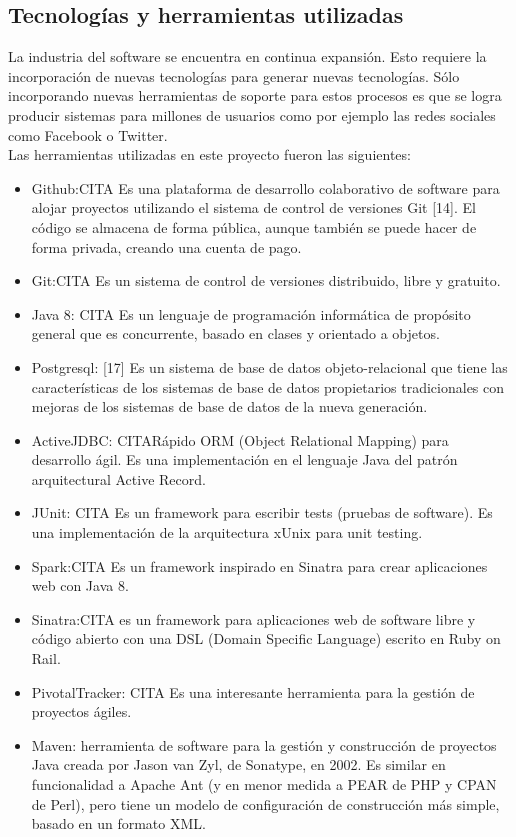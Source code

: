 \subsection{Tecnologías y herramientas utilizadas}
La industria del software se encuentra en continua expansión. Esto requiere la incorporación de nuevas tecnologías para generar
nuevas tecnologías. Sólo incorporando nuevas herramientas de soporte para estos procesos es que se logra producir sistemas para millones
de usuarios como por ejemplo las redes sociales como Facebook o Twitter. \\
Las herramientas utilizadas en este proyecto fueron las siguientes:
 \begin{itemize}
 \item Github:CITA Es una plataforma de desarrollo colaborativo de software para alojar proyectos utilizando el sistema de control de versiones Git [14]. El código se almacena de forma pública, aunque también se puede hacer de forma privada, creando una cuenta de pago. 
 \item Git:CITA Es un sistema de control de versiones distribuido, libre y gratuito.
 \item Java 8: CITA Es un lenguaje de programación informática de propósito general que es concurrente, basado en clases y orientado a objetos.
 \item Postgresql: [17] Es un sistema de base de datos objeto-relacional que tiene las características de los sistemas de base de datos propietarios tradicionales con mejoras de los sistemas de base de datos de la nueva generación.
 \item ActiveJDBC: CITARápido ORM (Object Relational Mapping) para desarrollo ágil. Es una implementación en el lenguaje Java del patrón arquitectural Active Record.
 \item JUnit: CITA Es un framework para escribir tests (pruebas de software). Es una implementación de la arquitectura xUnix para unit testing.
 \item Spark:CITA Es un framework inspirado en Sinatra para crear aplicaciones web con Java 8.
 \item Sinatra:CITA es un framework para aplicaciones web de software libre y código abierto con una DSL (Domain Specific Language) escrito en Ruby on Rail.
 \item PivotalTracker: CITA Es una interesante herramienta para la gestión de proyectos ágiles.
 \item Maven: herramienta de software para la gestión y construcción de proyectos Java creada por Jason van Zyl, de Sonatype, en 2002. Es similar en funcionalidad a Apache Ant (y en menor medida a PEAR de PHP y CPAN de Perl), pero tiene un modelo de configuración de construcción más simple, basado en un formato XML.

\end{itemize}
